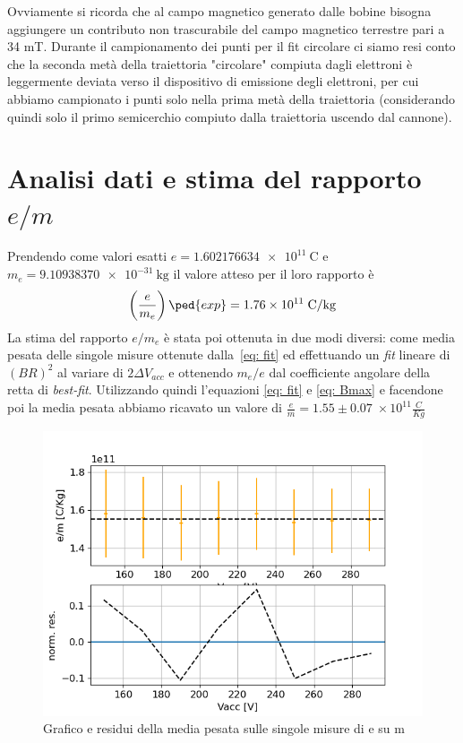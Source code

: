 \documentclass[10pt, a4paper, italian]{article}
\begin{document}
Ovviamente si ricorda che al campo magnetico generato dalle bobine bisogna aggiungere un contributo non trascurabile del campo magnetico terrestre pari a 34 mT.
Durante il campionamento dei punti per il fit circolare ci siamo resi conto che la seconda metà della traiettoria "circolare" compiuta dagli elettroni è leggermente deviata verso il dispositivo di emissione degli elettroni, per cui abbiamo campionato i punti solo nella prima metà della traiettoria (considerando quindi solo il primo semicerchio compiuto dalla traiettoria uscendo dal cannone).
\section{Analisi dati e stima del rapporto $e/m$}
Prendendo come valori esatti $e = \SI{1.602176634e11}{\coulomb}$ e
$m_{e} = \SI{9.10938370e-31}{\kilogram}$ il valore atteso per il loro
rapporto è
\begin{equation}\label{eq: e-m-exp}
\left(\frac{e}{m_{e}}\right)\ped{exp} = 1.76\times 10^{11}\; \si{\coulomb/\kilogram}
\end{equation}
La stima del rapporto $ e/m_{e} $ è stata poi ottenuta in due modi diversi:
come media pesata delle singole misure ottenute dalla~\eqref{eq: fit} ed
effettuando un \emph{fit} lineare di $ (BR)^2 $ al variare di
$ 2 \Delta V_{acc} $ e ottenendo $ m_e/e $ dal coefficiente angolare della retta
di \emph{best-fit}.
Utilizzando quindi l'equazioni \ref{eq: fit} e \ref{eq: Bmax} e facendone poi la media pesata abbiamo ricavato un valore di $\frac{e}{m}=1.55 \pm 0.07 \; \times 10^{11} \frac{C}{Kg}$ 
\begin{figure}
\includegraphics[width=\textwidth]{medpes}
\caption{Grafico e residui della media pesata sulle singole misure di e su m}
\end{figure}
\end{document}
